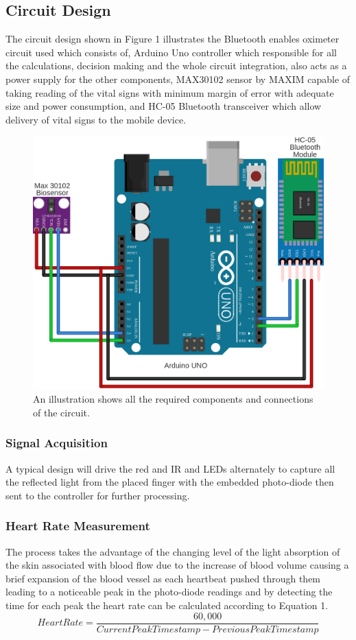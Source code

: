 \documentclass{bmcart}
\begin{document}
\subsection*{Circuit Design}
The circuit design shown in Figure 1 illustrates the Bluetooth enables oximeter
circuit used which consists of,  Arduino Uno controller which responsible for
all the calculations, decision making and the whole circuit integration, also
acts as a power supply for the other components, MAX30102 sensor by MAXIM
capable of taking reading of the vital signs with minimum margin of error with
adequate size and power consumption, and  HC-05 Bluetooth transceiver which
allow delivery of vital signs to the mobile device.

\begin{figure}[h!]
  \includegraphics[width=.75\linewidth]{png_images/circuit_desing.png}
  \caption{
      An illustration shows all the required components and connections of the circuit.}
\end{figure}
\FloatBarrier

\subsubsection*{Signal Acquisition}
A typical design will drive the red and IR and LEDs alternately to capture all
the reflected light from the placed finger with the embedded photo-diode then
sent to the controller for further processing.\\

\subsubsection*{Heart Rate Measurement}
The process takes the advantage of the changing level of the light absorption of
the skin associated with blood flow due to the increase of blood volume causing
a brief expansion of the blood vessel as each heartbeat pushed through them
leading to a noticeable peak in the photo-diode readings and by detecting the
time for each peak the heart rate can be calculated according to Equation 1.\\
%
\[
 Heart Rate = \frac{60,000}{Current Peak Timestamp - Previous Peak Timestamp}
 \tag{1}
\]
%
\end{document}
